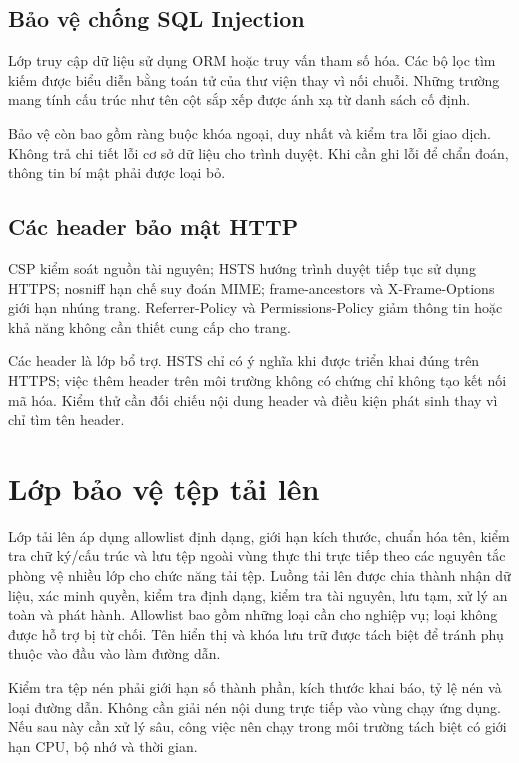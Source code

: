 \subsection{Bảo vệ chống SQL Injection}
Lớp truy cập dữ liệu sử dụng ORM hoặc truy vấn tham số hóa. Các bộ lọc tìm kiếm được biểu diễn bằng toán tử của thư viện thay vì nối chuỗi. Những trường mang tính cấu trúc như tên cột sắp xếp được ánh xạ từ danh sách cố định.

Bảo vệ còn bao gồm ràng buộc khóa ngoại, duy nhất và kiểm tra lỗi giao dịch. Không trả chi tiết lỗi cơ sở dữ liệu cho trình duyệt. Khi cần ghi lỗi để chẩn đoán, thông tin bí mật phải được loại bỏ.
\subsection{Các header bảo mật HTTP}
CSP kiểm soát nguồn tài nguyên; HSTS hướng trình duyệt tiếp tục sử dụng HTTPS; nosniff hạn chế suy đoán MIME; frame-ancestors và X-Frame-Options giới hạn nhúng trang. Referrer-Policy và Permissions-Policy giảm thông tin hoặc khả năng không cần thiết cung cấp cho trang.

Các header là lớp bổ trợ. HSTS chỉ có ý nghĩa khi được triển khai đúng trên HTTPS; việc thêm header trên môi trường không có chứng chỉ không tạo kết nối mã hóa. Kiểm thử cần đối chiếu nội dung header và điều kiện phát sinh thay vì chỉ tìm tên header.

\section{Lớp bảo vệ tệp tải lên}
Lớp tải lên áp dụng allowlist định dạng, giới hạn kích thước, chuẩn hóa tên, kiểm tra chữ ký/cấu trúc và lưu tệp ngoài vùng thực thi trực tiếp theo các nguyên tắc phòng vệ nhiều lớp cho chức năng tải tệp.\cite{upload}
Luồng tải lên được chia thành nhận dữ liệu, xác minh quyền, kiểm tra định dạng, kiểm tra tài nguyên, lưu tạm, xử lý an toàn và phát hành. Allowlist bao gồm những loại cần cho nghiệp vụ; loại không được hỗ trợ bị từ chối. Tên hiển thị và khóa lưu trữ được tách biệt để tránh phụ thuộc vào đầu vào làm đường dẫn.

Kiểm tra tệp nén phải giới hạn số thành phần, kích thước khai báo, tỷ lệ nén và loại đường dẫn. Không cần giải nén nội dung trực tiếp vào vùng chạy ứng dụng. Nếu sau này cần xử lý sâu, công việc nên chạy trong môi trường tách biệt có giới hạn CPU, bộ nhớ và thời gian.

